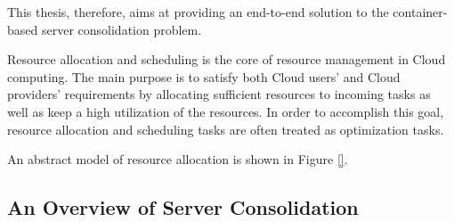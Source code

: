 
This thesis, therefore, aims at
providing an end-to-end solution to the container-based server consolidation problem.



Resource allocation and scheduling is the core of resource management in Cloud computing.
The main purpose is to satisfy both Cloud users' and Cloud providers' requirements by 
allocating sufficient resources to incoming tasks as well as keep a high utilization of the resources.
In order to accomplish this goal, 
resource allocation and scheduling tasks are often treated as optimization tasks.

An abstract model of resource allocation is shown in Figure \ref{}.





\subsection*{An Overview of Server Consolidation}

